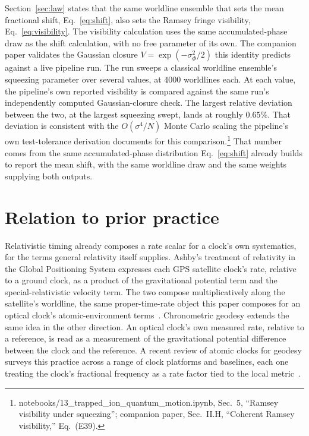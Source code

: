 \documentclass[aps,pra,superscriptaddress,groupedaddress,nofootinbib]{revtex4-2}
\begin{document}
Section~\ref{sec:law} states that the same worldline ensemble that
sets the mean fractional shift, Eq.~\eqref{eq:shift}, also sets the
Ramsey fringe visibility, Eq.~\eqref{eq:visibility}. The visibility
calculation uses the same accumulated-phase draw as the shift
calculation, with no free parameter of its own. The
companion paper validates the Gaussian closure $V =
\exp(-\sigma_\Phi^2/2)$ this identity predicts against a live
pipeline run. The run sweeps a classical worldline ensemble's
squeezing parameter over several values, at $4000$ worldlines each.
At each value, the pipeline's own reported visibility is compared
against the same run's independently computed Gaussian-closure check.
The largest relative deviation between the two, at the largest
squeezing swept, lands at roughly $0.65\%$. That deviation is
consistent with the $O(\sigma^4/N)$ Monte Carlo scaling the
pipeline's own test-tolerance derivation documents for this
comparison.\footnote{notebooks/13\_trapped\_ion\_quantum\_motion.ipynb,
Sec.~5, ``Ramsey visibility under squeezing''; companion paper,
Sec.~II.H, ``Coherent Ramsey visibility,'' Eq.~(E39).} That
number comes from the same accumulated-phase distribution
Eq.~\eqref{eq:shift} already builds to report the mean shift, with
the same worldline draw and the same weights supplying both outputs.

\section{Relation to prior practice}
\label{sec:prior}

Relativistic timing already composes a rate scalar for a clock's own
systematics, for the terms general relativity itself supplies.
Ashby's treatment of relativity in the Global Positioning System
expresses each GPS satellite clock's rate, relative to a ground
clock, as a product of the gravitational potential term and the
special-relativistic velocity term. The two compose multiplicatively
along the satellite's worldline, the same proper-time-rate object
this paper composes for an optical clock's atomic-environment
terms~\cite{Ashby2003}. Chronometric geodesy extends the same idea in
the other direction. An optical clock's own measured rate, relative
to a reference, is read as a measurement of the
gravitational potential difference between the clock and the
reference. A recent review of atomic clocks for geodesy
surveys this practice across a range of clock platforms and baselines,
each one treating the clock's fractional frequency as a rate factor tied to
the local metric~\cite{Mehlstaubler2018}.
\end{document}

